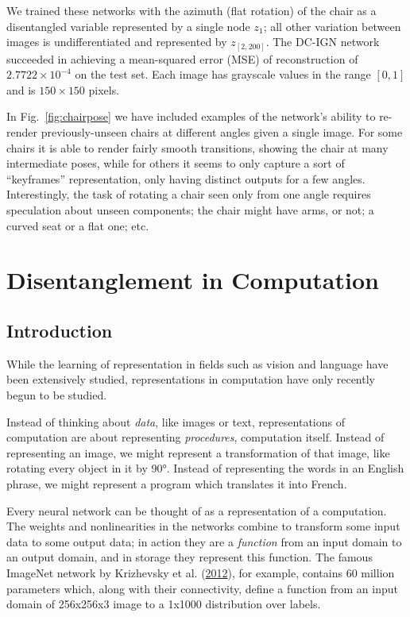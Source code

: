 \documentclass[12pt,twoside]{mitthesis}
\begin{document}
We trained these networks with the azimuth (flat rotation) of the chair
as a disentangled variable represented by a single node \(z_1\); all
other variation between images is undifferentiated and represented by
\(z_{[2,200]}\). The DC-IGN network succeeded in achieving a
mean-squared error (MSE) of reconstruction of \(2.7722 \times 10^{-4}\)
on the test set. Each image has grayscale values in the range \([0,1]\)
and is \(150 \times 150\) pixels.

In Fig.~\ref{fig:chairpose} we have included examples of the network's
ability to re-render previously-unseen chairs at different angles given
a single image. For some chairs it is able to render fairly smooth
transitions, showing the chair at many intermediate poses, while for
others it seems to only capture a sort of ``keyframes'' representation,
only having distinct outputs for a few angles. Interestingly, the task
of rotating a chair seen only from one angle requires speculation about
unseen components; the chair might have arms, or not; a curved seat or a
flat one; etc.

\chapter{Disentanglement in
Computation}\label{disentanglement-in-computation}

\section{Introduction}\label{introduction-2}

While the learning of representation in fields such as vision and
language have been extensively studied, representations in computation
have only recently begun to be studied.

Instead of thinking about \emph{data}, like images or text,
representations of computation are about representing \emph{procedures},
computation itself. Instead of representing an image, we might represent
a transformation of that image, like rotating every object in it by 90°.
Instead of representing the words in an English phrase, we might
represent a program which translates it into French.

Every neural network can be thought of as a representation of a
computation. The weights and nonlinearities in the networks combine to
transform some input data to some output data; in action they are a
\emph{function} from an input domain to an output domain, and in storage
they represent this function. The famous ImageNet network by Krizhevsky
et al. (\protect\hyperlink{ref-krizhevsky2012imagenet}{2012}), for
example, contains 60 million parameters which, along with their
connectivity, define a function from an input domain of 256x256x3 image
to a 1x1000 distribution over labels.
\end{document}

